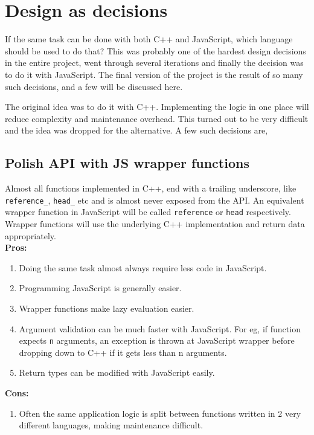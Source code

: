 \section{Design as  decisions}

If the same task can be done with both C++ and JavaScript, which language should
be used to do that? This was probably one of the hardest design decisions in the
entire project, went through several iterations and finally the decision was to
do it with JavaScript. The final version of the project is the result of so many
such decisions, and a few will be discussed here.

The original idea was to do it with C++. Implementing the logic in one place
will reduce complexity and maintenance overhead. This turned out to be very
difficult and the idea was dropped for the alternative. A few such decisions
are,

\subsection{Polish API with JS wrapper functions}

Almost all functions implemented in C++, end with a trailing underscore, like
\texttt{reference\_}, \texttt{head\_} etc and is almost never exposed from the
API. An equivalent wrapper function in JavaScript will be called
\texttt{reference} or \texttt{head} respectively. Wrapper functions will use the
underlying C++ implementation and return data appropriately. \\

\textbf{Pros:}
\begin{enumerate}

	\item Doing the same task almost always require less code in JavaScript.
    \item Programming JavaScript is generally easier.
    \item Wrapper functions make lazy evaluation easier.
    \item Argument validation can be much faster with JavaScript. For eg, if function
      expects \texttt{n} arguments, an exception is thrown at JavaScript wrapper
      before dropping down to C++ if it gets less than n arguments.
    \item Return types can be modified with JavaScript easily.

\end{enumerate}

\textbf{Cons:}
\begin{enumerate}

	\item Often the same application logic is split between functions written in 2
      very different languages, making maintenance difficult.

\end{enumerate}

